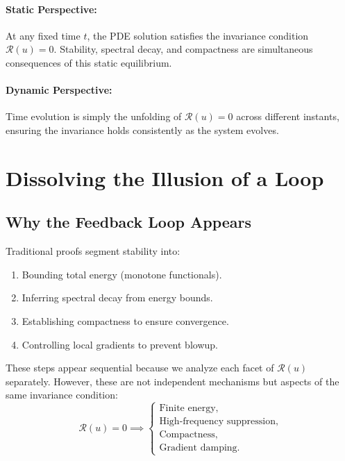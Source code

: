 \documentclass[12pt]{article}
\begin{document}
\paragraph{Static Perspective:} At any fixed time \(t\), the PDE solution satisfies the invariance condition \(\mathcal{R}(u) = 0\). Stability, spectral decay, and compactness are simultaneous consequences of this static equilibrium.

\paragraph{Dynamic Perspective:} Time evolution is simply the unfolding of \(\mathcal{R}(u) = 0\) across different instants, ensuring the invariance holds consistently as the system evolves.

\section{Dissolving the Illusion of a Loop}

\subsection{Why the Feedback Loop Appears}
Traditional proofs segment stability into:
\begin{enumerate}
    \item Bounding total energy (monotone functionals).
    \item Inferring spectral decay from energy bounds.
    \item Establishing compactness to ensure convergence.
    \item Controlling local gradients to prevent blowup.
\end{enumerate}
These steps appear sequential because we analyze each facet of \(\mathcal{R}(u)\) separately. However, these are not independent mechanisms but aspects of the same invariance condition:
\begin{equation}
\mathcal{R}(u) = 0 \implies \begin{cases}
\text{Finite energy,} \\
\text{High-frequency suppression,} \\
\text{Compactness,} \\
\text{Gradient damping.}
\end{cases}
\end{equation}
\end{document}

